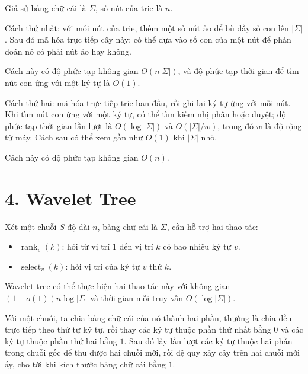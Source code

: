 \documentclass[11pt]{article}
\DeclareMathOperator{\rank}{rank}
\begin{document}
Giả sử bảng chữ cái là \(\Sigma\), số nút của trie là \(n\).

Cách thứ nhất: với mỗi nút của trie, thêm một số nút ảo để bù đầy số con lên
\(|\Sigma|\). Sau đó mã hóa trực tiếp cây này; có thể dựa vào số con của một
nút để phán đoán nó có phải nút ảo hay không.

Cách này có độ phức tạp không gian \(O(n|\Sigma|)\), và độ phức tạp thời gian
để tìm nút con ứng với một ký tự là \(O(1)\).

Cách thứ hai: mã hóa trực tiếp trie ban đầu, rồi ghi lại ký tự ứng với mỗi
nút. Khi tìm nút con ứng với một ký tự, có thể tìm kiếm nhị phân hoặc duyệt;
độ phức tạp thời gian lần lượt là \(O(\log|\Sigma|)\) và
\(O(|\Sigma|/w)\), trong đó \(w\) là độ rộng từ máy. Cách sau có thể xem gần
như \(O(1)\) khi \(|\Sigma|\) nhỏ.

Cách này có độ phức tạp không gian \(O(n)\).

\section*{4. Wavelet Tree}

Xét một chuỗi \(S\) độ dài \(n\), bảng chữ cái là \(\Sigma\), cần hỗ trợ hai
thao tác:

\begin{itemize}
  \item \(\rank_v(k)\): hỏi từ vị trí \(1\) đến vị trí \(k\) có bao nhiêu ký
        tự \(v\).
  \item \(\operatorname{select}_v(k)\): hỏi vị trí của ký tự \(v\) thứ \(k\).
\end{itemize}

Wavelet tree có thể thực hiện hai thao tác này với không gian
\((1+o(1))n\log|\Sigma|\) và thời gian mỗi truy vấn \(O(\log|\Sigma|)\).

Với một chuỗi, ta chia bảng chữ cái của nó thành hai phần, thường là chia đều
trực tiếp theo thứ tự ký tự, rồi thay các ký tự thuộc phần thứ nhất bằng \(0\)
và các ký tự thuộc phần thứ hai bằng \(1\). Sau đó lấy lần lượt các ký tự
thuộc hai phần trong chuỗi gốc để thu được hai chuỗi mới, rồi đệ quy xây cây
trên hai chuỗi mới ấy, cho tới khi kích thước bảng chữ cái bằng \(1\).
\end{document}
